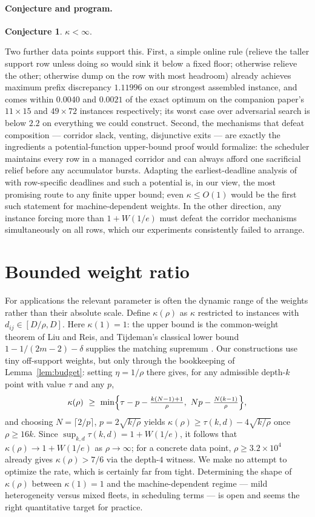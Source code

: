 \documentclass[11pt]{article}
\theoremstyle{definition}
\newtheorem{conjecture}[theorem]{Conjecture}
\newcommand{\W}{W}
\begin{document}
\paragraph{Conjecture and program.}
\begin{conjecture}\label{conj:finite}
$\kappa<\infty$.
\end{conjecture}
Two further data points support this.  First, a simple online rule
(relieve the taller support row unless doing so would sink it below a
fixed floor; otherwise relieve the other; otherwise dump on the row with
most headroom) already achieves maximum prefix discrepancy $1.11996$ on
our strongest assembled instance, and comes within $0.0040$ and $0.0021$ of
the exact optimum on the companion paper's $11\times15$ and $49\times72$
instances respectively; its worst case over adversarial search is below
$2.2$ on everything we could construct.  Second, the mechanisms
that defeat composition --- corridor slack, venting, disjunctive exits ---
are exactly the ingredients a potential-function upper-bound proof would
formalize: the scheduler maintains every row in a managed corridor and
can always afford one sacrificial relief before any accumulator bursts.
Adapting the earliest-deadline analysis of \citep{LiuReis2026} with
row-specific deadlines and such a potential is, in our view, the most
promising route to any finite upper bound; even $\kappa\le O(1)$ would be
the first such statement for machine-dependent weights.  In the other
direction, any instance forcing more than $1+\W(1/e)$ must defeat the
corridor mechanisms simultaneously on all rows, which our experiments
consistently failed to arrange.

\section{Bounded weight ratio}\label{sec:rho}

For applications the relevant parameter is often the dynamic range of the
weights rather than their absolute scale.  Define $\kappa(\rho)$ as
$\kappa$ restricted to instances with $d_{ij}\in[D/\rho,D]$.  Here
$\kappa(1)=1$: the upper bound is the common-weight theorem of Liu and
Reis, and Tijdeman's classical lower bound $1-1/(2m-2)-\delta$ supplies
the matching supremum \citep{Tijdeman1973,Meijer1973}.  Our constructions use tiny off-support
weights, but only through the bookkeeping of Lemma~\ref{lem:budget}:
setting $\eta=1/\rho$ there gives, for any admissible depth-$k$ point
with value $\tau$ and any $p$,
\[
 \kappa(\rho)\ \ge\
 \min\Bigl\{\tau-p-\tfrac{k(N-1)+1}{\rho},\ Np-\tfrac{N(k-1)}{\rho}\Bigr\},
\]
and choosing $N=\lceil2/p\rceil$, $p=2\sqrt{k/\rho}$ yields
$\kappa(\rho)\ge\tau(k,d)-4\sqrt{k/\rho}$ once $\rho\ge16k$.  Since
$\sup_{k,d}\tau(k,d)=1+\W(1/e)$, it follows that
$\kappa(\rho)\to1+\W(1/e)$ as $\rho\to\infty$; for a concrete data point,
$\rho\ge3.2\times10^4$ already gives $\kappa(\rho)>7/6$ via the depth-$4$
witness.  We make no attempt to optimize the rate, which is certainly far
from tight.  Determining the shape of $\kappa(\rho)$ between
$\kappa(1)=1$ and the machine-dependent regime --- mild heterogeneity
versus mixed fleets, in scheduling terms --- is open and seems the right
quantitative target for practice.
\end{document}
